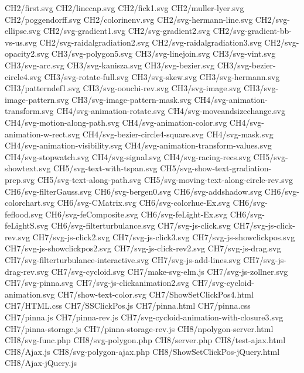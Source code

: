 CH2/first.svg
CH2/linecap.svg
CH2/fick1.svg
CH2/muller-lyer.svg
CH2/poggendorff.svg
CH2/colorinenv.svg
CH2/svg-hermann-line.svg
CH2/svg-ellipse.svg
CH2/svg-gradient1.svg
CH2/svg-gradient2.svg
CH2/svg-gradient-bb-vs-us.svg
CH2/svg-raidalgradiation2.svg
CH2/svg-raidalgradiation3.svg
CH2/svg-opacity2.svg
CH3/svg-polygon5.svg
CH3/svg-linejoin.svg
CH3/svg-vint.svg
CH3/svg-arc.svg
CH3/svg-kanisza.svg
CH3/svg-bezier.svg
CH3/svg-bezier-circle4.svg
CH3/svg-rotate-full.svg
CH3/svg-skew.svg
CH3/svg-hermann.svg
CH3/patterndef1.svg
CH3/svg-oouchi-rev.svg
CH3/svg-image.svg
CH3/svg-image-pattern.svg
CH3/svg-image-pattern-mask.svg
CH4/svg-animation-transform.svg
CH4/svg-animation-rotate.svg
CH4/svg-moveandsizechange.svg
CH4/svg-motion-along-path.svg
CH4/svg-animation-color.svg
CH4/svg-animation-w-rect.svg
CH4/svg-bezier-circle4-square.svg
CH4/svg-mask.svg
CH4/svg-animation-visibility.svg
CH4/svg-animation-transform-values.svg
CH4/svg-stopwatch.svg
CH4/svg-signal.svg
CH4/svg-racing-recs.svg
CH5/svg-showtext.svg
CH5/svg-text-with-tspan.svg
CH5/svg-show-text-gradiation-prep.svg
CH5/svg-text-along-path.svg
CH5/svg-moving-text-along-circle-rev.svg
CH6/svg-filterGauss.svg
CH6/svg-bergen0.svg
CH6/svg-addshadow.svg
CH6/svg-colorchart.svg
CH6/svg-CMatrix.svg
CH6/svg-colorhue-Ex.svg
CH6/svg-feflood.svg
CH6/svg-feComposite.svg
CH6/svg-feLight-Ex.svg
CH6/svg-feLightS.svg
CH6/svg-filterturbulance.svg
CH7/svg-js-click.svg
CH7/svg-js-click-rev.svg
CH7/svg-js-click2.svg
CH7/svg-js-click3.svg
CH7/svg-js-showclickpos.svg
CH7/svg-js-showclickpos2.svg
CH7/svg-js-click-rev2.svg
CH7/svg-js-drag.svg
CH7/svg-filterturbulance-interactive.svg
CH7/svg-js-add-lines.svg
CH7/svg-js-drag-rev.svg
CH7/svg-cycloid.svg
CH7/make-svg-elm.js
CH7/svg-js-zollner.svg
CH7/svg-pinna.svg
CH7/svg-js-clickanimation2.svg
CH7/svg-cycloid-animation.svg
CH7/show-text-color.svg
CH7/ShowSetClickPos4.html
CH7/HTML.css
CH7/SSClickPos.js
CH7/pinna.html
CH7/pinna.css
CH7/pinna.js
CH7/pinna-rev.js
CH7/svg-cycloid-animation-with-closure3.svg
CH7/pinna-storage.js
CH7/pinna-storage-rev.js
CH8/npolygon-server.html
CH8/svg-func.php
CH8/svg-polygon.php
CH8/server.php
CH8/test-ajax.html
CH8/Ajax.js
CH8/svg-polygon-ajax.php
CH8/ShowSetClickPos-jQuery.html
CH8/Ajax-jQuery.js
